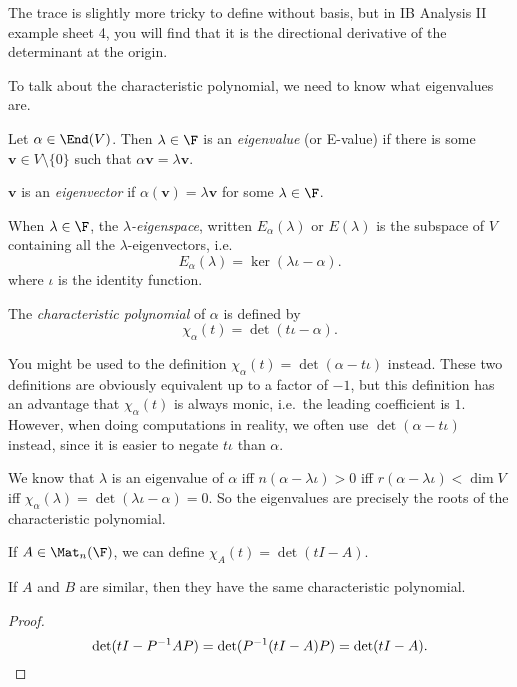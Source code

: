 \documentclass[a4paper]{article}
\begin{document}
The trace is slightly more tricky to define without basis, but in IB Analysis II example sheet 4, you will find that it is the directional derivative of the determinant at the origin.

To talk about the characteristic polynomial, we need to know what eigenvalues are.
\begin{defi}
  Let $\alpha \in \End(V)$. Then $\lambda \in \F$ is an \emph{eigenvalue} (or E-value) if there is some $\mathbf{v} \in V\setminus \{0\}$ such that $\alpha \mathbf{v} = \lambda \mathbf{v}$.

  $\mathbf{v}$ is an \emph{eigenvector} if $\alpha(\mathbf{v}) = \lambda \mathbf{v}$ for some $\lambda \in \F$.

  When $\lambda \in \F$, the \emph{$\lambda$-eigenspace}, written $E_\alpha(\lambda)$ or $E(\lambda)$ is the subspace of $V$ containing all the $\lambda$-eigenvectors, i.e.
  \[
    E_\alpha(\lambda) = \ker (\lambda \iota - \alpha).
  \]
  where $\iota$ is the identity function.
\end{defi}
\begin{defi}
  The \emph{characteristic polynomial} of $\alpha$ is defined by
  \[
    \chi_\alpha(t) = \det (t\iota - \alpha).
  \]
\end{defi}
You might be used to the definition $\chi_\alpha(t) = \det(\alpha - t \iota)$ instead. These two definitions are obviously equivalent up to a factor of $-1$, but this definition has an advantage that $\chi_\alpha(t)$ is always monic, i.e.\ the leading coefficient is $1$. However, when doing computations in reality, we often use $\det (\alpha - t\iota)$ instead, since it is easier to negate $t \iota$ than $\alpha$.

We know that $\lambda$ is an eigenvalue of $\alpha$ iff $n(\alpha - \lambda \iota) > 0$ iff $r(\alpha - \lambda \iota) < \dim V$ iff $\chi_\alpha(\lambda) = \det(\lambda \iota - \alpha) = 0$. So the eigenvalues are precisely the roots of the characteristic polynomial.

If $A \in \Mat_n(\F)$, we can define $\chi_A(t) = \det (tI - A)$.
\begin{lemma}
  If $A$ and $B$ are similar, then they have the same characteristic polynomial.
\end{lemma}

\begin{proof}
  \[
    \det (tI - P^{-1}AP) = \det(P^{-1}(tI - A)P) = \det(tI - A).\qedhere
  \]
\end{proof}
\end{document}
